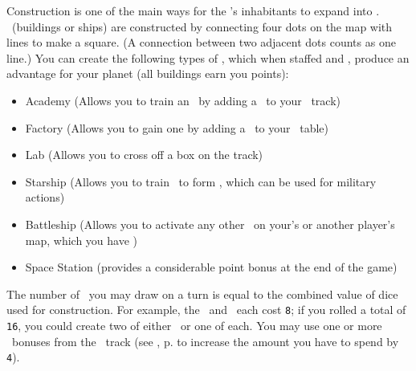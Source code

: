 Construction is one of the main ways for the \planet's inhabitants to expand into \outerspace.  \fortifications\ (buildings or ships) are constructed by connecting four dots on the map with lines to make a square. (A connection between two adjacent dots counts as one line.)
\newline\newline
You can create the following types of \fortifications, which when staffed and \activated, produce an advantage for your planet (all buildings earn you points):
\begin{itemize}
  \item Academy (Allows you to train an \astronaut\ by adding a \gainastronautsymbol\ to your \population\ track)
  \item Factory (Allows you to gain one \currency by adding a \gaincurrency\ to your \currency\ table)
  \item Lab (Allows you to cross off a box on the \tech track)
  \item Starship (Allows you to train \astronauts\ to form \squadrons, which can be used for military actions)
  \item Battleship (Allows you to activate any other \fortification\ on your's or another player's map, which you have \reach)
  \item Space Station (provides a considerable point bonus at the end of the game)
\end{itemize}
The number of \fortifications\ you may draw on a turn is equal to the combined value of dice used for construction.  For example, the \academy\ and \factory\ each cost \texttt{8}; if you rolled a total of \texttt{16}, you could create two of either \fortifications\ or one of each.  You may use one or more \greatperson\ bonuses from the \population\ track (see , p.\pageref{sec:population} to increase the amount you have to spend by \texttt{4}).
